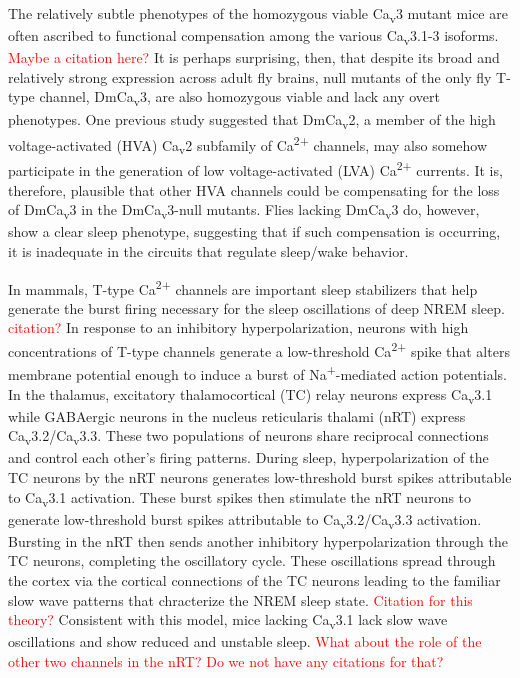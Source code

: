 The relatively subtle phenotypes of the homozygous viable Ca\textsubscript{v}3 mutant mice are often ascribed to functional compensation among the various Ca\textsubscript{v}3.1-3 isoforms. \textcolor{red}{Maybe a citation here?}
It is perhaps surprising, then, that despite its broad and relatively strong expression across adult fly brains, null mutants of the only fly T-type channel, DmCa\textsubscript{v}3, are also homozygous viable and lack any overt phenotypes.
One previous study suggested that DmCa\textsubscript{v}2, a member of the high voltage-activated (HVA) Ca\textsubscript{v}2 subfamily of Ca\textsuperscript{2+} channels, may also somehow participate in the generation of low voltage-activated (LVA) Ca\textsuperscript{2+} currents\cite{Ryglewski:2012jk}.
It is, therefore, plausible that other HVA channels could be compensating for the loss of DmCa\textsubscript{v}3 in the DmCa\textsubscript{v}3-null mutants. Flies lacking DmCa\textsubscript{v}3 do, however, show a clear sleep phenotype, suggesting that if such compensation is occurring, it is inadequate in the circuits that regulate sleep/wake behavior.

In mammals, T-type Ca\textsuperscript{2+} channels are important sleep stabilizers that help generate the burst firing necessary for the sleep oscillations of deep NREM sleep. \textcolor{red}{citation?}
In response to an inhibitory hyperpolarization, neurons with high concentrations of T-type channels generate a low-threshold Ca\textsuperscript{2+} spike that alters membrane potential enough to induce a burst of Na\textsuperscript{+}-mediated action potentials.
In the thalamus, excitatory thalamocortical (TC) relay neurons express Ca\textsubscript{v}3.1 while GABAergic neurons in the nucleus reticularis thalami (nRT) express Ca\textsubscript{v}3.2/Ca\textsubscript{v}3.3.
These two populations of neurons share reciprocal connections and control each other's firing patterns.
During sleep, hyperpolarization of the TC neurons by the nRT neurons generates low-threshold burst spikes attributable to Ca\textsubscript{v}3.1 activation.
These burst spikes then stimulate the nRT neurons to generate low-threshold burst spikes attributable to Ca\textsubscript{v}3.2/Ca\textsubscript{v}3.3 activation.
Bursting in the nRT then sends another inhibitory hyperpolarization through the TC neurons, completing the oscillatory cycle.
These oscillations spread through the cortex via the cortical connections of the TC neurons leading to the familiar slow wave patterns that chracterize the NREM sleep state. \textcolor{red}{Citation for this theory?}
Consistent with this model, mice lacking Ca\textsubscript{v}3.1 lack slow wave oscillations and show reduced and unstable sleep\cite{Lee:2004ey}. \textcolor{red}{What about the role of the other two channels in the nRT? Do we not have any citations for that?}

